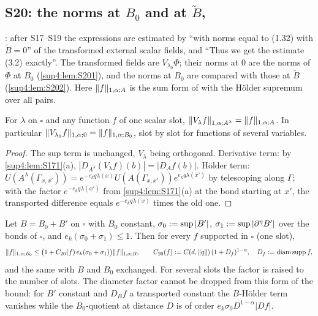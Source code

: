 
\subsection{S20: the norms \cite[(1.32)]{Ba3} at $B_0$ and at $\tilde B$, \cite[p.~434]{Ba3}}\label{sup4:ssec:S20}

\cite[p.~434]{Ba3}: after S17--S19 the expressions are estimated by \cite[(3.3)]{Ba3} ``with norms equal to (1.32) with $\tilde B=0$'' of the transformed external scalar fields, and ``Thus we get the estimate (3.2) exactly''. The transformed fields are $V_{\lambda_0}\Phi$; their norms at $0$ are the norms of $\Phi$ at $B_0$ (\cref{sup4:lem:S201}), and the norms at $B_0$ are compared with those at $\tilde B$ (\cref{sup4:lem:S202}). Here $\lVert f\rVert_{1,\alpha;A}$ is the sum form of \cite[(1.32)]{Ba3} with the H\"older supremum over all pairs.

\begin{lemma}\label{sup4:lem:S201}
For $\lambda$ on $\square$ and any function $f$ of one scalar slot, $\lVert V_\lambda f\rVert_{1,\alpha;A^\lambda}=\lVert f\rVert_{1,\alpha;A}$. In particular $\lVert V_{\lambda_0}f\rVert_{1,\alpha;0}=\lVert f\rVert_{1,\alpha;B_0}$, slot by slot for functions of several variables.
\end{lemma}

\begin{proof}
The sup term is unchanged, $V_\lambda$ being orthogonal. Derivative term: by \cref{sup4:lem:S171}(a), $|D_{A^\lambda}(V_\lambda f)(b)|=|D_Af(b)|$. H\"older term: $U(A^\lambda(\Gamma_{x,x'}))=e^{-e_kq\lambda(x)}U(A(\Gamma_{x,x'}))e^{e_kq\lambda(x')}$ by telescoping along $\Gamma$; with the factor $e^{-e_kq\lambda(x')}$ from \cref{sup4:lem:S171}(a) at the bond starting at $x'$, the transported difference equals $e^{-e_kq\lambda(x)}$ times the old one.
\end{proof}

\begin{lemma}\label{sup4:lem:S202}
Let $B=B_0+B'$ on $\square$ with $B_0$ constant, $\sigma_0:=\sup|B'|$, $\sigma_1:=\sup|\partial^\eta B'|$ over the bonds of $\square$, and $e_k(\sigma_0+\sigma_1)\le1$. Then for every $f$ supported in $\square$ (one slot),
\[
\lVert f\rVert_{1,\alpha;B_0}\le\big(1+C_{20}(f)\,e_k(\sigma_0+\sigma_1)\big)\lVert f\rVert_{1,\alpha;B},\qquad C_{20}(f):= C(d,\lVert q\rVert)\,(1+D_f)^{1-\alpha},\quad D_f:=\operatorname{diam}\operatorname{supp} f,
\]
and the same with $B$ and $B_0$ exchanged. For several slots the factor is raised to the number of slots. The diameter factor cannot be dropped from this form of the bound: for $B'$ constant and $D_Bf$ a transported constant the $B$-H\"older term vanishes while the $B_0$-quotient at distance $D$ is of order $e_k\sigma_0D^{1-\alpha}|Df|$.
\end{lemma}


